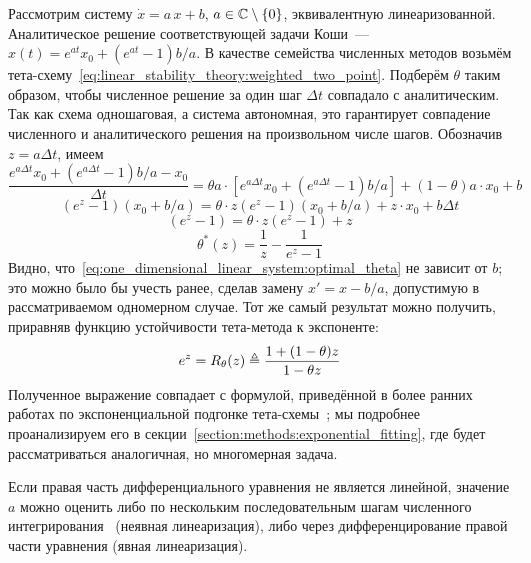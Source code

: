 Рассмотрим систему $ \dot x = a \, x + b $, $ a \in \mathbb{C} \setminus \{ 0 \} $,
эквивалентную линеаризованной.
Аналитическое решение соответствующей задачи Коши~--- $ x(t) = e^{a t} x_0 + (e^{a t} - 1) b / a $.
В качестве семейства численных методов возьмём тета-схему~\eqref{eq:linear_stability_theory:weighted_two_point}.
%
%
Подберём $ \theta $ таким образом,
чтобы численное решение за один шаг $ \Delta t $ совпадало с аналитическим.
Так как схема одношаговая, а система автономная,
это гарантирует совпадение численного и аналитического решения на произвольном числе шагов.
Обозначив $ z = a \Delta t $, имеем
\[
    \frac{e^{a \Delta t} x_0 + (e^{a \Delta t} - 1) b / a - x_0}{\Delta t} = \theta a \cdot \left[ e^{a \Delta t} x_0 + (e^{a \Delta t} - 1) b / a \right] + (1 - \theta) a \cdot x_0 + b
\]
\[
    (e^{z} - 1)(x_0 + b / a) = \theta \cdot z (e^{z} - 1)(x_0 + b / a) + z \cdot x_0 + b \Delta t
\]
\[
    (e^{z} - 1) = \theta \cdot z (e^{z} - 1) + z
\]
\begin{equation}
    \label{eq:one_dimensional_linear_system:optimal_theta}
    \theta^*(z) = \frac{1}{z} - \frac{1}{e^{z} - 1}
\end{equation}
%
Видно, что~\eqref{eq:one_dimensional_linear_system:optimal_theta} не зависит от $ b $;
это можно было бы учесть ранее, сделав замену $ x' = x - b/a $,
допустимую в рассматриваемом одномерном случае.
Тот же самый результат можно получить, приравняв функцию устойчивости тета-метода к экспоненте:
\[
    e^z = R_\theta(z) \triangleq \frac{1 + (1 - \theta) z}{1 - \theta z}
\]
Полученное выражение совпадает с формулой, приведённой в более ранних работах по
экспоненциальной подгонке тета-схемы~\cite{liniger1970efficient_integration_methods, lambert1991methods, berzins1992adaptive_theta_method};
мы подробнее проанализируем его в секции~\ref{section:methods:exponential_fitting},
где будет рассматриваться аналогичная,
но многомерная задача.

Если правая часть дифференциального уравнения не является линейной,
значение $ a $ можно оценить либо по нескольким последовательным шагам численного интегрирования~\cite{berzins1992adaptive_theta_method}
(неявная линеаризация),
либо через дифференцирование правой части уравнения (явная линеаризация).

